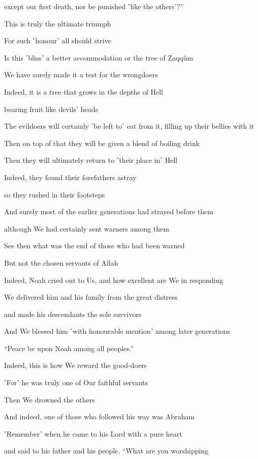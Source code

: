 except our first death, nor be punished ˹like the others˺?”

This is truly the ultimate triumph

For such ˹honour˺ all should strive

Is this ˹bliss˺ a better accommodation or the tree of Zaqqûm

We have surely made it a test for the wrongdoers

Indeed, it is a tree that grows in the depths of Hell

bearing fruit like devils’ heads

The evildoers will certainly ˹be left to˺ eat from it, filling up their bellies with it

Then on top of that they will be given a blend of boiling drink

Then they will ultimately return to ˹their place in˺ Hell

Indeed, they found their forefathers astray

so they rushed in their footsteps

And surely most of the earlier generations had strayed before them

although We had certainly sent warners among them

See then what was the end of those who had been warned

But not the chosen servants of Allah

Indeed, Noah cried out to Us, and how excellent are We in responding

We delivered him and his family from the great distress

and made his descendants the sole survivors

And We blessed him ˹with honourable mention˺ among later generations

“Peace be upon Noah among all peoples.”

Indeed, this is how We reward the good-doers

˹For˺ he was truly one of Our faithful servants

Then We drowned the others

And indeed, one of those who followed his way was Abraham

˹Remember˺ when he came to his Lord with a pure heart

and said to his father and his people, “What are you worshipping


